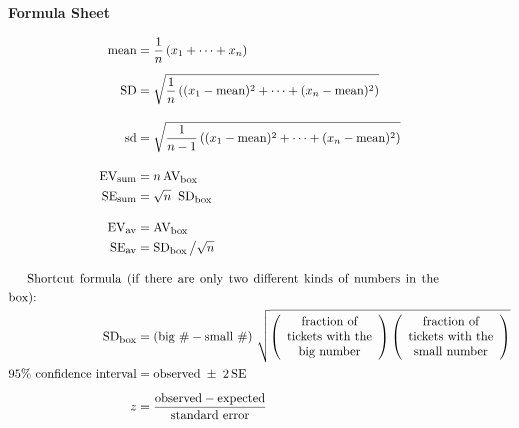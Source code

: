 \documentclass[10pt]{article}
\begin{document}
\begin{center}
\textbf{\large Formula Sheet}
\end{center}\vspace{-15pt}
\begin{align*}
\mbox{mean} &=\frac{1}{n}\left(x_1 + \cdots + x_n\right)\\[5pt]
\mbox{SD}   &=\sqrt{\frac{1}{n}\left( (x_1 - \mbox{mean})^2 + \cdots + (x_n - \mbox{mean})^2\right)}\\[10pt]
\mbox{sd}   &=\sqrt{\frac{1}{n-1}\left( (x_1 - \mbox{mean})^2 + \cdots + (x_n - \mbox{mean})^2\right)}\\[10pt]
%
\mbox{EV}_{\mbox{\footnotesize sum}} & = n\,\mbox{AV}_{\mbox{\footnotesize box}}\\
\mbox{SE}_{\mbox{\footnotesize sum}} & = \sqrt{n}\;\;\mbox{SD}_{\mbox{\footnotesize box}}\\[10pt]
%
\mbox{EV}_{\mbox{\footnotesize av}} & = \mbox{AV}_{\mbox{\footnotesize box}}\\
\mbox{SE}_{\mbox{\footnotesize av}} & = \mbox{SD}_{\mbox{\footnotesize box}}\,\big{/}\sqrt{n}\\[10pt]
%
%
\noalign{Shortcut formula (if there are only two different kinds of numbers in the box):}
\mbox{SD}_{\mbox{\footnotesize box}} &=
  \left(\mbox{big \#} - \mbox{small \#}\right)\,\sqrt{
  \left(\begin{array}{c}\mbox{fraction of}\\ \mbox{tickets with the}\\ \mbox{big number}\end{array}\right)
  \left(\begin{array}{c}\mbox{fraction of}\\\mbox{tickets with the}\\\mbox{small number}\end{array}\right)}\\
%
\mbox{95\% confidence interval} &= \mbox{observed} \;\pm\; 2\,\mbox{SE}\\[5pt]
z &= \frac{\mbox{observed} - \mbox{expected}}{\mbox{standard error}}
\end{align*}
\vfill
\end{document}
